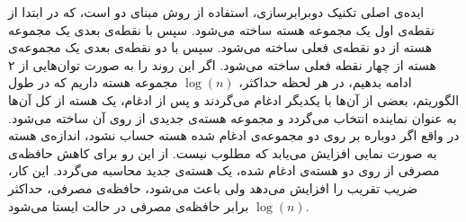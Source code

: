 



ایده‌ی اصلی تکنیک دوبرابرسازی، استفاده از روش مبنای دو است، که در ابتدا از نقطه‌ی اول یک مجموعه هسته ساخته می‌شود.
سپس با نقطه‌ی بعدی یک مجموعه هسته از دو نقطه‌ی فعلی ساخته می‌شود.
سپس با دو نقطه‌ی بعدی یک مجموعه‌ی هسته از چهار نقطه فعلی ساخته می‌شود.
اگر این روند را به صورت توان‌هایی از ۲ ادامه بدهیم، در هر لحظه حداکثر، $\log(n)$ مجموعه هسته داریم که در طول الگوریتم، بعضی از آن‌ها با یکدیگر ادغام می‌گردند و پس از ادغام، یک هسته از کل آن‌ها به عنوان نماینده انتخاب می‌گردد و مجموعه هسته‌ی جدیدی از روی آن ساخته می‌شود.
در واقع اگر دوباره بر روی دو مجموعه‌ی ادغام شده هسته حساب نشود، اندازه‌ی هسته به صورت نمایی افزایش می‌یابد که مطلوب نیست.
از این رو برای کاهش حافظه‌ی مصرفی از روی دو هسته‌ی ادغام شده، یک هسته‌ی جدید محاسبه می‌گردد.
این کار، ضریب تقریب را افزایش می‌دهد ولی باعث می‌شود، حافظه‌ی مصرفی، حداکثر $\log(n)$ برابر حافظه‌ی مصرفی در حالت ایستا می‌شود.